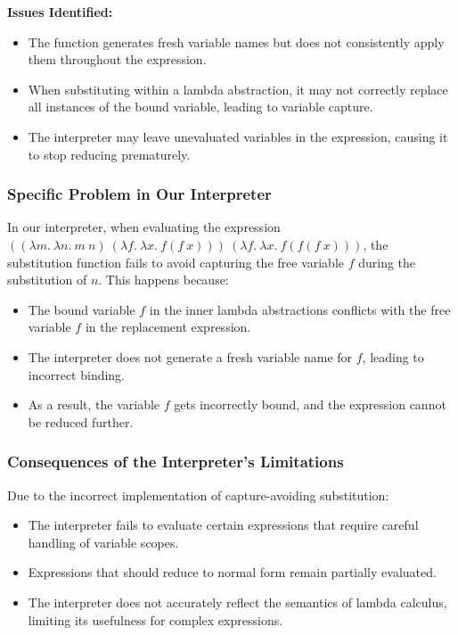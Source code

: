\documentclass{article}
\begin{document}
\textbf{Issues Identified:}

\begin{itemize}
    \item The function generates fresh variable names but does not consistently apply them throughout the expression.
    \item When substituting within a lambda abstraction, it may not correctly replace all instances of the bound variable, leading to variable capture.
    \item The interpreter may leave unevaluated variables in the expression, causing it to stop reducing prematurely.
\end{itemize}

\subsubsection*{Specific Problem in Our Interpreter}

In our interpreter, when evaluating the expression \(\left((\lambda m.\ \lambda n.\ m\ n)\ (\lambda f.\ \lambda x.\ f(f\ x))\right)\ (\lambda f.\ \lambda x.\ f(f(f\ x)))\), the substitution function fails to avoid capturing the free variable \(f\) during the substitution of \(n\). This happens because:

\begin{itemize}
    \item The bound variable \(f\) in the inner lambda abstractions conflicts with the free variable \(f\) in the replacement expression.
    \item The interpreter does not generate a fresh variable name for \(f\), leading to incorrect binding.
    \item As a result, the variable \(f\) gets incorrectly bound, and the expression cannot be reduced further.
\end{itemize}

\subsubsection*{Consequences of the Interpreter's Limitations}

Due to the incorrect implementation of capture-avoiding substitution:

\begin{itemize}
    \item The interpreter fails to evaluate certain expressions that require careful handling of variable scopes.
    \item Expressions that should reduce to normal form remain partially evaluated.
    \item The interpreter does not accurately reflect the semantics of lambda calculus, limiting its usefulness for complex expressions.
\end{itemize}
\end{document}
